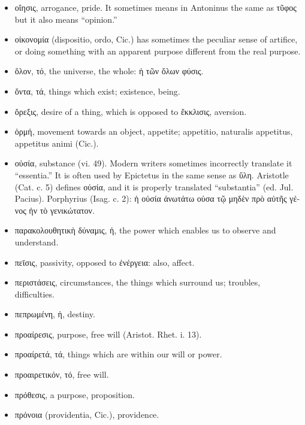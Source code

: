 \begin{itemize}[leftmargin=*]
\setlength\itemsep{0em}
\item
  \textgreek{οἴησις}, arrogance, pride. It sometimes means in Antoninus the same as
  \textgreek{τῦφος} but it also means ``opinion.''
\item
  \textgreek{οἰκονομία} (dispositio, ordo, Cic.) has sometimes the peculiar sense of
  artifice, or doing something with an apparent purpose different from
  the real purpose.
\item
  \textgreek{ὅλον, τό}, the universe, the whole: \textgreek{ἡ τῶν ὄλων φύσις}.
\item
  \textgreek{ὄντα, τά}, things which exist; existence, being.
\item
  \textgreek{ὄρεξις}, desire of a thing, which is opposed to \textgreek{ἔκκλισις}, aversion.
\item
  \textgreek{ὁρμή}, movement towards an object, appetite; appetitio, naturalis
  appetitus, appetitus animi (Cic.).
\item
  \textgreek{οὐσία}, substance (vi. 49). Modern writers sometimes incorrectly
  translate it ``essentia.'' It is often used by Epictetus in the same
  sense as \textgreek{ὕλη}. Aristotle (Cat. c. 5) defines \textgreek{οὐσία}, and it is properly
  translated ``substantia'' (ed. Jul. Pacius). Porphyrius (Isag. c. 2):
  \textgreek{ἡ οὐσία ἀνωτάτω οὐσα τῷ μηδὲν πρὸ αὐτῆς γένος ἠν τὸ γενικώτατον}.
\end{itemize}

\begin{itemize}[leftmargin=*]
\setlength\itemsep{0em}
\item
  \textgreek{παρακολουθητικὴ δύναμις, ἡ}, the power which enables us to observe and
  understand.
\item
  \textgreek{πεῑσις}, passivity, opposed to \textgreek{ἐνέργεια}: also, affect.
\item
  \textgreek{περιστάσεις}, circumstances, the things which surround us; troubles,
  difficulties.
\item
  \textgreek{πεπρωμένη, ἡ}, destiny.
\item
  \textgreek{προαίρεσις}, purpose, free will (Aristot. Rhet. i. 13).
\item
  \textgreek{προαίρετά, τά}, things which are within our will or power.
\item
  \textgreek{προαιρετικόν, τό}, free will.
\item
  \textgreek{πρόθεσις}, a purpose, proposition.
\item
  \textgreek{πρόνοια} (providentia, Cic.), providence.
\end{itemize}

